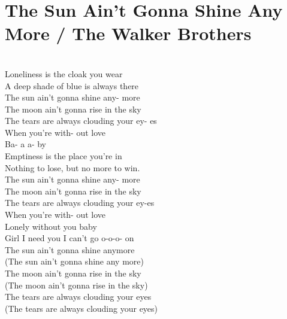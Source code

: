 \section{The Sun Ain't Gonna Shine Any More / The Walker Brothers}\label{sec:sunaintgonnashineanymore}

\Aseven
\Cmajor
\CmajorSeven
\DmajorEasy
\Dminor
\Eminor
\Gmajor


         \\
 Loneliness  is the cloak you wear\\
 A deep shade of blue  is always there\\
 The sun ain't gonna shine any-  more\\
The moon ain't gonna rise in the  sky\\
The tears are always clouding your  ey-  es\\
When you're with-  out love\\
 Ba- a a- by\\
 Emptiness  is the place you're in\\
 Nothing to lose, but no  more to win.\\
 The sun ain't gonna shine any-  more\\
The moon ain't gonna rise in the  sky\\
The tears are always clouding your  ey-es\\
When you're with-  out love\\
 Lonely  without you  baby\\
Girl I  need you  I can't go  o-o-o-  on\\
The  sun ain't gonna shine anymore\\
(The sun ain't gonna shine any  more)\\
The  moon ain't gonna rise in the sky\\
(The moon ain't gonna rise in the  sky)\\
The  tears are always clouding your eyes\\
(The tears are always clouding your  eyes)\\
